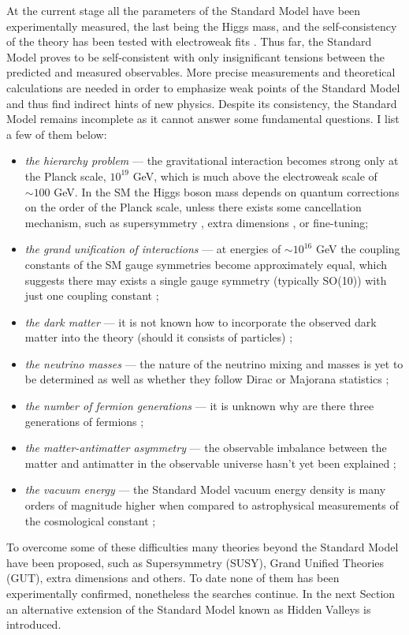 At the current stage all the parameters of the Standard Model have been experimentally measured,
the last being the Higgs mass, and the
self-consistency of the theory has been tested with electroweak fits \cite{Baak:2013ppa}.
Thus far, the Standard Model proves to be self-consistent with only insignificant tensions between
the predicted and measured observables. More precise measurements and theoretical calculations
are needed in order to emphasize weak points of the Standard Model and thus
find indirect hints of new physics.
Despite its consistency, the Standard Model remains incomplete as it cannot answer some fundamental 
questions. I list a few of them below:
\begin{itemize}
 \item {\it the hierarchy problem} --- the gravitational interaction becomes strong only at the 
Planck scale, $10^{19}$ GeV, which is much above the electroweak scale of $\sim 100$ GeV. 
In the SM the Higgs boson mass 
depends on quantum corrections on the order of the Planck scale, unless there
exists some cancellation mechanism, such as supersymmetry \cite{Martin:1997ns}, extra dimensions
\cite{ArkaniHamed:1998rs,Zee:2003mt}, or fine-tuning; 
 \item {\it the grand unification of interactions} --- at energies of $\sim 10^{16}$ GeV
the coupling constants of the SM gauge symmetries become approximately equal, which suggests
there may exists a single gauge symmetry (typically SO(10)) with just one coupling constant
\cite{Georgi:1974sy,Buras197866};
 \item {\it the dark matter} --- it is not known how to incorporate the observed
 dark matter into the theory (should it consists of particles) \cite{Bertone2005279};
 \item {\it the neutrino masses} --- the nature of the neutrino mixing and masses is yet to be
determined as well as whether they follow Dirac or Majorana statistics \cite{Fukuda:1998fd};
 \item {\it the number of fermion generations} --- it is unknown why are there three generations
of fermions \cite{Decamp:1989tu};
 \item {\it the matter-antimatter asymmetry} --- the observable imbalance between the matter and
antimatter in the observable universe hasn't yet been explained \cite{Fukugita:1986hr};
 \item {\it the vacuum energy} --- the Standard Model vacuum
energy density is many orders of magnitude higher when compared to astrophysical measurements
of the cosmological constant \cite{Sahni:1999gb,Rugh2002663};
\end{itemize}
To overcome some of these difficulties many theories beyond the Standard Model have been
proposed, such as Supersymmetry (SUSY), Grand Unified Theories (GUT), extra dimensions and others.
To date none of them has been experimentally confirmed, nonetheless the searches continue.
In the next Section an alternative extension of the Standard Model known as Hidden Valleys 
is introduced. 


